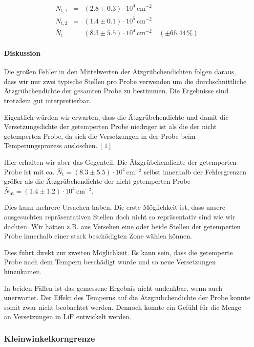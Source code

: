 \documentclass[12pt,a4paper]{scrartcl}
\numberwithin{equation}{section} %
\renewcommand{\[}{} %
\renewcommand{\]}{\noindent} %
\begin{document}
\[
\begin{eqnarray}
    N_\mathrm{t,1} &=& (2.8 \pm 0.3) \cdot 10^4 \mathrm{\, cm^{-2}} \\
    N_\mathrm{t,2} &=& (1.4 \pm 0.1) \cdot 10^5 \mathrm{\, cm^{-2}}
    \\
    \bar N_\mathrm{t}
        &=& (8.3 \pm 5.5) \cdot 10^4 \mathrm{\, cm^{-2}}
        \quad(\pm 66.44\,\%)
\end{eqnarray}
\]

\hypertarget{diskussion}{%
\paragraph{Diskussion}\label{diskussion}}

Die großen Fehler in den Mittelwerten der Ätzgrübchendichten folgen
daraus, dass wir nur zwei typische Stellen pro Probe verwenden um die
durchschnittliche Ätzgrübchendichte der gesamten Probe zu bestimmen. Die
Ergebnisse sind trotzdem gut interpretierbar.

Eigentlich würden wir erwarten, dass die Ätzgrübchendichte und damit die
Versetzungsdichte der getemperten Probe niedriger ist als die der nicht
getemperten Probe, da sich die Versetzungen in der Probe beim
Temperungsprozess auslöschen. \([1]\)

Hier erhalten wir aber das Gegenteil. Die Ätzgrübchendichte der
getemperten Probe ist mit ca.
\(\bar N_\mathrm{t}=(8.3\pm 5.5) \cdot 10^4 \mathrm{\, cm^{-2}}\) selbst
innerhalb der Fehlergrenzen größer als die Ätzgrübchendichte der nicht
getemperten Probe
\(\bar N_\mathrm{nt}=(1.4 \pm 1.2) \cdot 10^4 \mathrm{\, cm^{-2}}\).

Dies kann mehrere Ursachen haben. Die erste Möglichkeit ist, dass unsere
ausgesuchten repräsentativen Stellen doch nicht so repräsentativ sind
wie wir dachten. Wir hätten z.B. aus Versehen eine oder beide Stellen
der getemperten Probe innerhalb einer stark beschädigten Zone wählen
können.

Dies führt direkt zur zweiten Möglichkeit. Es kann sein, dass die
getemperte Probe nach dem Tempern beschädigt wurde und so neue
Versetzungen hinzukamen.

In beiden Fällen ist das gemessene Ergebnis nicht undenkbar, wenn auch
unerwartet. Der Effekt des Temperns auf die Ätzgrübchendichte der Probe
konnte somit zwar nicht beobachtet werden. Dennoch konnte ein Gefühl für
die Menge an Versetzungen in \(\mathrm{LiF}\) entwickelt werden.

\hypertarget{kleinwinkelkorngrenze}{%
\subsubsection{Kleinwinkelkorngrenze}\label{kleinwinkelkorngrenze}}
\end{document}
